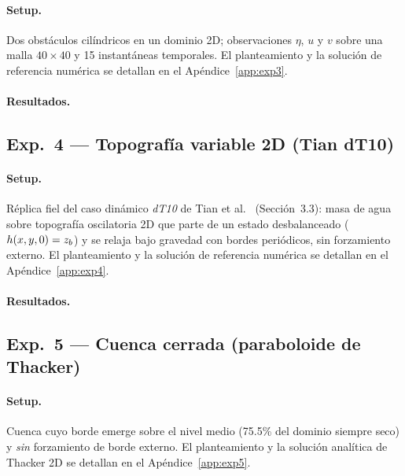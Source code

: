 \paragraph{Setup.}
Dos obstáculos cilíndricos en un dominio 2D; observaciones $\eta$, $u$ y $v$
sobre una malla $40\times40$ y 15 instantáneas temporales. El planteamiento y
la solución de referencia numérica se detallan en el Apéndice~\ref{app:exp3}.

\paragraph{Resultados.}

\subsection{Exp.\ 4 --- Topografía variable 2D (Tian dT10)}
\label{sec:exp4}

\paragraph{Setup.}
Réplica fiel del caso dinámico \emph{dT10} de Tian et al.\ \cite{tian2025}
(Sección~3.3): masa de agua sobre topografía oscilatoria 2D que parte de un
estado desbalanceado ($h(x,y,0) = z_b$) y se relaja bajo gravedad con bordes
periódicos, sin forzamiento externo. El planteamiento y la solución de
referencia numérica se detallan en el Apéndice~\ref{app:exp4}.

\paragraph{Resultados.}

\subsection{Exp.\ 5 --- Cuenca cerrada (paraboloide de Thacker)}
\label{sec:exp5}

\paragraph{Setup.}
Cuenca cuyo borde emerge sobre el nivel medio (75.5\% del dominio siempre
seco) y \emph{sin} forzamiento de borde externo. El planteamiento y la
solución analítica de Thacker 2D se detallan en el Apéndice~\ref{app:exp5}.

